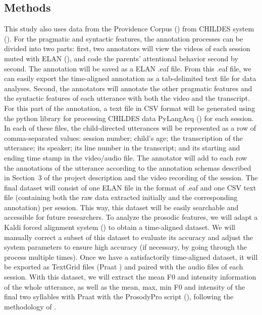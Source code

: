 \subsection{Methods}
\label{sec:engsp:corpus:method}
This study also uses data from the Providence Corpus (\citealt{ProvidenceCorpus}) from CHILDES system (\citealt{CHILDES}). For the pragmatic and syntactic features, the annotation processes can be divided into two parts: first, two annotators will view the videos of each session muted with ELAN (\citealt{ELAN}), and code the parents' attentional behavior second by second. The annotation will be saved as a ELAN .eaf file. From this .eaf file, we can easily export the time-aligned annotation as a tab-delimited text file for data analyses. Second, the annotators will annotate the other pragmatic features and the syntactic features of each utterance with both the video and the transcript. For this part of the annotation, a text file in CSV format will be generated using the python library for processing CHILDES data PyLangAcq (\citealt{pylangacq}) for each session. In each of these files, the child-directed utterances will be represented as a row of comma-separated values: session number; child's age; the transcription of the utterance; its speaker; its line number in the transcript; and its starting and ending time stamp in the video/audio file. The annotator will add to each row the annotations of the utterance according to the annotation schemas described in Section~3 of the project description and the video recording of the session. The final dataset will consist of one ELAN file in the format of .eaf and one CSV text file (containing both the raw data extracted initially and the corresponding annotation) per session. This way, this dataset will be easily searchable and accessible for future researchers. To analyze the prosodic features, we will adapt a Kaldi forced alignment system (\cite{kaldi}) to obtain a time-aligned dataset. We will manually correct a subset of this dataset to evaluate its accuracy and adjust the system parameters to ensure high accuracy (if necessary, by going through the process multiple times). Once we have a satisfactorily time-aligned dataset, it will be exported as TextGrid files (Praat \cite{praat}) and paired with the audio files of each session. With this dataset, we will extract the mean F0 and intensity information of the whole utterance, as well as the mean, max, min F0 and intensity of the final two syllables with Praat with the ProsodyPro script (\cite{xu2018prosody}), following the methodology of \cite{geffenmintz2017final}. 





